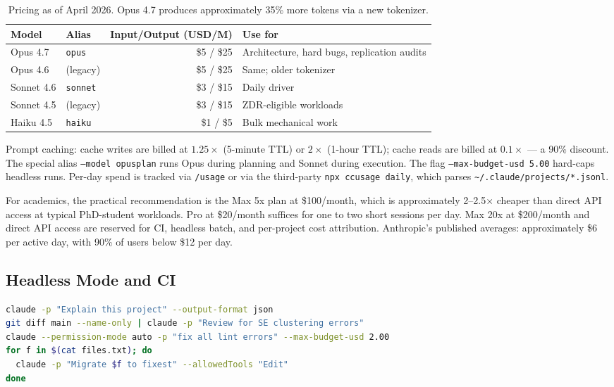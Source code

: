 \documentclass[11pt]{article}
\begin{document}
\begin{table}[h]
\centering
\small
\begin{tabular}{@{}llrl@{}}
\toprule
\textbf{Model} & \textbf{Alias} & \textbf{Input/Output (USD/M)} & \textbf{Use for} \\
\midrule
Opus 4.7 & \texttt{opus} & \$5 / \$25 & Architecture, hard bugs, replication audits \\
Opus 4.6 & (legacy)      & \$5 / \$25 & Same; older tokenizer \\
Sonnet 4.6 & \texttt{sonnet} & \$3 / \$15 & Daily driver \\
Sonnet 4.5 & (legacy)     & \$3 / \$15 & ZDR-eligible workloads \\
Haiku 4.5 & \texttt{haiku} & \$1 / \$5 & Bulk mechanical work \\
\bottomrule
\end{tabular}
\caption{Pricing as of April 2026. Opus 4.7 produces approximately 35\% more tokens via a new tokenizer.}
\end{table}

Prompt caching: cache writes are billed at $1.25\times$ (5-minute TTL) or $2\times$ (1-hour TTL); cache reads are billed at $0.1\times$ --- a 90\% discount. The special alias \texttt{--model opusplan} runs Opus during planning and Sonnet during execution. The flag \texttt{--max-budget-usd 5.00} hard-caps headless runs. Per-day spend is tracked via \texttt{/usage} or via the third-party \texttt{npx ccusage daily}, which parses \texttt{\textasciitilde/.claude/projects/*.jsonl}.

For academics, the practical recommendation is the Max 5x plan at \$100/month, which is approximately 2--2.5$\times$ cheaper than direct API access at typical PhD-student workloads. Pro at \$20/month suffices for one to two short sessions per day. Max 20x at \$200/month and direct API access are reserved for CI, headless batch, and per-project cost attribution. Anthropic's published averages: approximately \$6 per active day, with 90\% of users below \$12 per day.

\subsection{Headless Mode and CI}

\begin{lstlisting}[language=bash]
claude -p "Explain this project" --output-format json
git diff main --name-only | claude -p "Review for SE clustering errors"
claude --permission-mode auto -p "fix all lint errors" --max-budget-usd 2.00
for f in $(cat files.txt); do
  claude -p "Migrate $f to fixest" --allowedTools "Edit"
done
\end{lstlisting}
\end{document}
